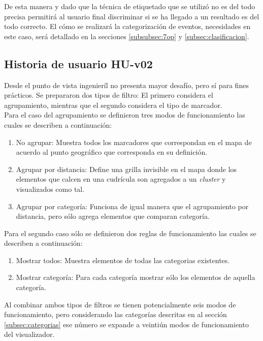 De esta manera y dado que la técnica de etiquetado que se utilizó no es del todo precisa permitirá al usuario final discriminar si se ha llegado a un resultado es del todo correcto. El cómo se realizará la categorización de eventos, necesidades en este caso, será detallado en la secciones \ref{subsubsec:7op} y \ref{subsec:clasificacion}.

\subsection{Historia de usuario HU-v02}
\label{subsec:HU-v02}

Desde el punto de vista ingenieríl no presenta mayor desafío, pero sí para fines prácticos. Se prepararon dos tipos de filtro: El primero considera el agrupamiento, mientras que el segundo considera el tipo de marcador.\\

Para el caso del agrupamiento se definieron tres modos de funcionamiento las cuales se describen a continuación:

\begin{enumerate}
\item No agrupar: Muestra todos los marcadores que correspondan en el mapa de acuerdo al punto geográfico que corresponda en su definición.
\item Agrupar por distancia: Define una grilla invisible en el mapa donde los elementos que calcen en una cudrícula son agregados a un \textit{cluster} y visualizados como tal.
\item Agrupar por categoría: Funciona de igual manera que el agrupamiento por distancia, pero sólo agrega elementos que comparan categoría.
\end{enumerate}

Para el segundo caso sólo se definieron dos reglas de funcionamiento las cuales se describen a continuación:

\begin{enumerate}
\item Mostrar todos: Muestra elementos de todas las categorias existentes.
\item Mostrar categoría: Para cada categoría mostrar sólo los elementos de aquella categoría. 
\end{enumerate}

Al combinar ambos tipos de filtros se tienen potencialmente seis modos de funcionamiento, pero considerando las categorías descritas en al sección \ref{subsec:categorias} ese número se expande a veintiún modos de funcionamiento del visualizador.\\

